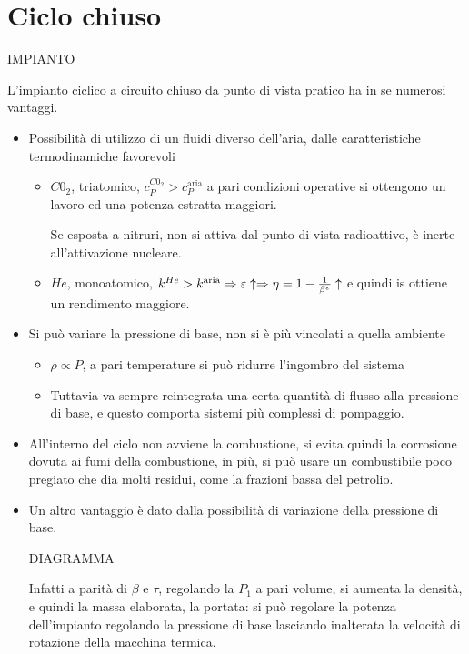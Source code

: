 \section{Ciclo chiuso}
\begin{adjustwidth}{2in}{}	
	
	IMPIANTO
	
	L'impianto ciclico a circuito chiuso da punto di vista pratico ha in se numerosi vantaggi. 
	
	\begin{itemize}
		\item Possibilità di utilizzo di un fluidi diverso dell'aria, dalle caratteristiche termodinamiche favorevoli
		\begin{itemize}
			\item $C0_2$, triatomico, $c_P^{C0_2}>c_P^{\text{aria}}$ a pari condizioni operative si ottengono un lavoro ed una potenza estratta maggiori. 
			
			Se esposta a nitruri, non si attiva dal punto di vista radioattivo, è inerte all'attivazione nucleare. 
			
			\item $He$, monoatomico, $k^{He}>k^{\text{aria}}\Rightarrow \varepsilon\uparrow\Rightarrow\eta = 1-{1\over\beta^\varepsilon} \uparrow$ e quindi is ottiene un rendimento maggiore.
		\end{itemize}
		
		\item Si può variare la pressione di base, non si è più vincolati a quella ambiente
		\begin{itemize}
			\item $\rho\propto P$, a pari temperature si può ridurre l'ingombro del sistema
			\item Tuttavia va sempre reintegrata una certa quantità di flusso alla pressione di base, e questo comporta sistemi più complessi di pompaggio.
		\end{itemize}
		
		\item All'interno del ciclo non avviene la combustione, si evita quindi la corrosione dovuta ai fumi della combustione, in più, si può usare un combustibile poco pregiato che dia molti residui, come la frazioni bassa del petrolio. 
		
		\item Un altro vantaggio è dato dalla possibilità di variazione della pressione di base. 
		
		DIAGRAMMA 
		
		Infatti a parità di $\beta$ e $\tau$, regolando la $P_1$ a pari volume, si aumenta la densità, e quindi la massa elaborata, la portata: si può regolare la potenza dell'impianto regolando la pressione di base lasciando inalterata la velocità di rotazione della macchina termica. 
	\end{itemize}
	

\end{adjustwidth}
